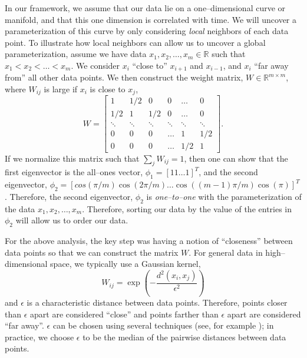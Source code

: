 \documentclass[11pt]{article}
\begin{document}
In our framework, we assume that our data lie on a one--dimensional curve or manifold, and that this one dimension is correlated with time. 
%
We will uncover a parameterization of this curve by only considering {\em local} neighbors of each data point.
%
To illustrate how local neighbors can allow us to uncover a global parameterization, assume we have data $x_1, x_2, \dots, x_m \in \mathbb{R}$ such that $x_1 < x_2 < \dots < x_m$.
%
We consider $x_i$ ``close to'' $x_{i+1}$ and $x_{i-1}$, and $x_i$ ``far away from'' all other data points. 
%
We then construct the weight matrix, $W \in \mathbb{R}^{m \times m}$, where $W_{ij}$ is large if $x_i$ is close to $x_j$,
\begin{equation}
W = 
\begin{bmatrix}
	1 & 1/2 & 0 & 0 & \dots & 0 \\
	1/2 & 1 & 1/2 & 0 & \dots & 0 \\
	\ddots & \ddots & \ddots & \ddots & \ddots & \ddots \\
	0 & 0 & 0 & \dots & 1 & 1/2 \\
	0 & 0 & 0 & \dots & 1/2 & 1 
\end{bmatrix}.
\end{equation}
%
If we normalize this matrix such that $\sum_j W_{ij} = 1$, then one can show that the first eigenvector is the all--ones vector, $\phi_1 = [1 1 \dots 1]^T$, and the second eigenvector, $\phi_2 = [cos(\pi/m) \cos(2 \pi/ m) \dots \cos((m-1) \pi / m) \cos(\pi)]^T$.
%
Therefore, the second eigenvector, $\phi_2$ is {\em one--to--one} with the parameterization of the data $x_1, x_2, \dots, x_m$. 
%
Therefore, sorting our data by the value of the entries in $\phi_2$ will allow us to order our data.

For the above analysis, the key step was having a notion of ``closeness'' between data points so that we can construct the matrix $W$.
%
For general data in high--dimensional space, we typically use a Gaussian kernel,
\begin{equation} \label{eq:dmaps_W}
W_{ij} = \exp \left( -\frac{d^2(x_i, x_j)}{\epsilon^2} \right)
\end{equation}
and $\epsilon$ is a characteristic distance between data points.
%
Therefore, points closer than $\epsilon$ apart are considered ``close'' and points farther than $\epsilon$ apart are considered ``far away''.
%
$\epsilon$ can be chosen using several techniques (see, for example \cite{coifman2008graph}); in practice, we choose $\epsilon$ to be the median of the pairwise distances between data points.
\end{document}
